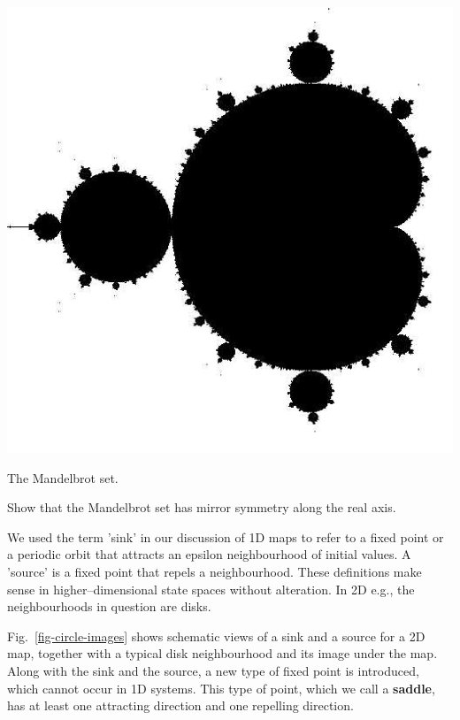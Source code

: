 \begin{marginfigure}
\centering
\includegraphics{dynamic/figures/mandelbrot}
\caption{The Mandelbrot set.}
\label{fig-mandelbrot}
\end{marginfigure} 


\begin{exer}
Show that the Mandelbrot set has mirror symmetry along the real axis.
\end{exer}

\pagebreak


We used the term 'sink' in our discussion of 1D maps to refer to a fixed point or a periodic orbit that attracts an epsilon neighbourhood of initial values. A 'source' is a fixed point that repels a neighbourhood. These definitions make sense in higher--dimensional state spaces without alteration. In 2D e.g., the neighbourhoods in question are disks.

Fig.~\ref{fig-circle-images} shows schematic views of a sink and a source for a 2D map, together with a typical disk neighbourhood and its image under the map. Along with the sink and the source, a new type of fixed point is introduced, which cannot occur in 1D systems. This type of point, which we call a \textbf{saddle}, has at least one attracting direction and one repelling direction.

